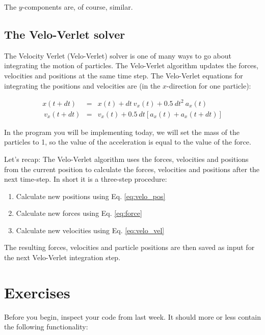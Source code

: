 \documentclass{article}
\begin{document}
The $y$-components are, of course, similar.

\subsection{The Velo-Verlet solver}


The Velocity Verlet (Velo-Verlet) solver is one of many ways to go about
integrating the motion of particles. The Velo-Verlet algorithm
updates the forces, velocities and positions at the same time step. The
Velo-Verlet equations for integrating the positions and velocities are (in the
$x$-direction for one particle):

\begin{eqnarray}
x(t + dt) &=& x(t) + dt\ v_x(t) + 0.5\ dt^2\ a_x(t) \label{eq:velo_pos} \\\
v_x(t + dt) &=& v_x(t) + 0.5\ dt \left[a_x(t) + a_x(t+dt)\right] \label{eq:velo_vel}
\end{eqnarray}

In the program you will be implementing today, we will set the mass of the particles
to 1, so the value of the acceleration is equal to the value of the
force.

Let's recap: The Velo-Verlet algorithm uses the forces,
velocities and positions from the current position to calculate the forces,
velocities and positions after the next time-step. In short it is a three-step
procedure:

\begin{enumerate}
    \item Calculate new positions using Eq. \ref{eq:velo_pos}
    \item Calculate new forces using Eq. \ref{eq:force}
    \item Calculate new velocities using Eq. \ref{eq:velo_vel}
\end{enumerate}

The resulting forces, velocities and particle positions are then saved as input
for the next Velo-Verlet integration step.


\newpage
\clearpage
\section{Exercises}

Before you begin, inspect your code from last week. It should more or less
contain the following functionality:

\end{document}
